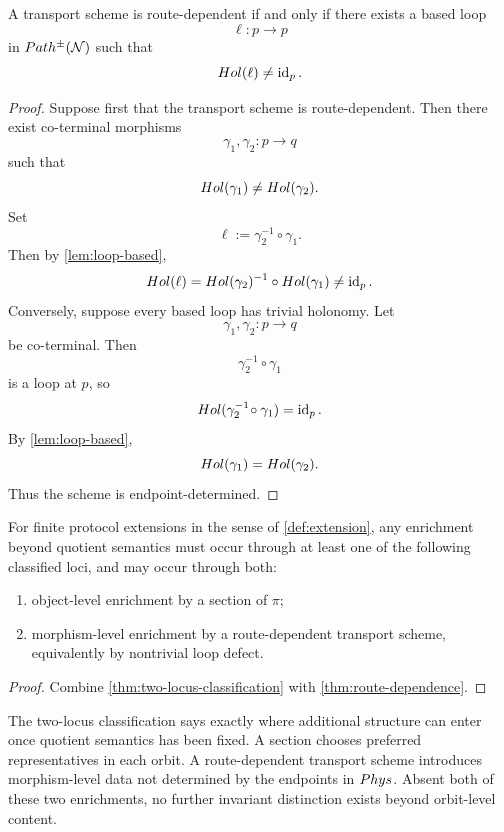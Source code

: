 \begin{theorem}
	\label{thm:route-dependence}
	A transport scheme is route-dependent if and only if there exists a
	based loop
	\[
		\ell:p\to p
	\]
	in \(Path^\pm(\mathcal N)\) such that
	\[
		Hol(\ell)\neq \operatorname{id}_p.
	\]
\end{theorem}
\begin{proof}
	Suppose first that the transport scheme is route-dependent. Then there
	exist co-terminal morphisms
	\[
		\gamma_1,\gamma_2:p\to q
	\]
	such that
	\[
		Hol(\gamma_1)\neq Hol(\gamma_2).
	\]
	Set
	\[
		\ell:=\gamma_2^{-1}\!\circ\gamma_1.
	\]
	Then by \cref{lem:loop-based},
	\[
		Hol(\ell)
		=
		Hol(\gamma_2)^{-1}\circ Hol(\gamma_1)
		\neq \operatorname{id}_p.
	\]
	Conversely, suppose every based loop has trivial holonomy. Let
	\[
		\gamma_1,\gamma_2:p\to q
	\]
	be co-terminal. Then
	\[
		\gamma_2^{-1}\!\circ\gamma_1
	\]
	is a loop at \(p\), so
	\[
		Hol(\gamma_2^{-1}\!\circ\gamma_1)=\operatorname{id}_p.
	\]
	By \cref{lem:loop-based},
	\[
		Hol(\gamma_1)=Hol(\gamma_2).
	\]
	Thus the scheme is endpoint-determined.
\end{proof}
\begin{corollary}
	\label{cor:transport-form}
	For finite protocol extensions in the sense of \cref{def:extension},
	any enrichment beyond quotient semantics must occur through at least
	one of the following classified loci, and may occur through both:
	\begin{enumerate}[label=\textup{(\roman*)}]
		\item object-level enrichment by a section of \(\pi\);
		\item morphism-level enrichment by a route-dependent transport scheme,
		      equivalently by nontrivial loop defect.
	\end{enumerate}
\end{corollary}
\begin{proof}
	Combine \cref{thm:two-locus-classification} with
	\cref{thm:route-dependence}.
\end{proof}
\begin{remark}
	The two-locus classification says exactly where additional structure
	can enter once quotient semantics has been fixed. A section chooses
	preferred representatives in each orbit. A route-dependent transport
	scheme introduces morphism-level data not determined by the endpoints
	in \(Phys\). Absent both of these two enrichments, no further
	invariant distinction exists beyond orbit-level content.
\end{remark}
